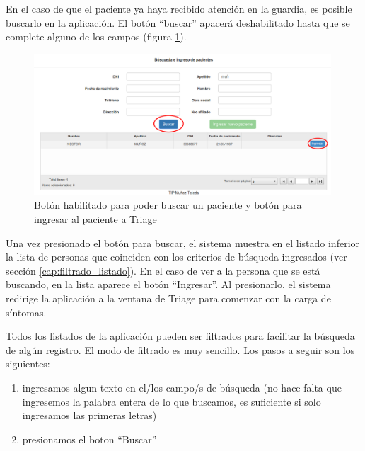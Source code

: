 En el caso de que el paciente ya haya recibido atención en la guardia, es posible buscarlo en la aplicación. El botón ``buscar'' apacerá deshabilitado hasta que se complete alguno de los campos (figura \ref{fig:inicio_busqueda}).
\begin{figure}
\centerline{\includegraphics[width=0.99\textwidth]{inicio_busqueda.png}}
\caption{Botón habilitado para poder buscar un paciente y botón para ingresar al paciente a Triage} \label{fig:inicio_busqueda}
\end{figure}
Una vez presionado el botón para buscar, el sistema muestra en el listado inferior la lista de personas que coinciden con los criterios de búsqueda ingresados (ver sección \ref{cap:filtrado_listado}). En el caso de ver a la persona que se está buscando, en la lista aparece el botón ``Ingresar''. Al presionarlo, el sistema redirige la aplicación a la ventana de Triage para comenzar con la carga de síntomas.

\label{cap:filtrado_listado}
Todos los listados de la aplicación pueden ser filtrados para facilitar la búsqueda de algún registro. El modo de filtrado es muy sencillo. Los pasos a seguir son los siguientes:
\begin{enumerate}
\item ingresamos algun texto en el/los campo/s de búsqueda (no hace falta que ingresemos la palabra entera de lo que buscamos, es suficiente si solo ingresamos las primeras letras)
\item presionamos el boton ``Buscar''
\end{enumerate}

